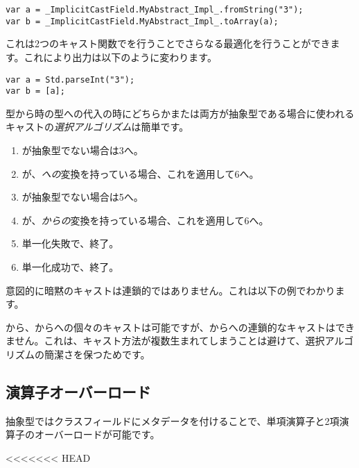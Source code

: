 \begin{lstlisting}
var a = _ImplicitCastField.MyAbstract_Impl_.fromString("3");
var b = _ImplicitCastField.MyAbstract_Impl_.toArray(a);
\end{lstlisting}

これは2つのキャスト関数でを行うことでさらなる最適化を行うことができます。これにより出力は以下のように変わります。

\begin{lstlisting}
var a = Std.parseInt("3");
var b = [a];
\end{lstlisting}


型から時の型への代入の時にどちらかまたは両方が抽象型である場合に使われるキャストの\emph{選択アルゴリズム}は簡単です。

\begin{enumerate}
	\item {}が抽象型でない場合は3へ。
	\item {}が、\emph{への}変換を持っている場合、これを適用して6へ。
	\item {}が抽象型でない場合は5へ。
	\item {}が、\emph{からの}変換を持っている場合、これを適用して6へ。
	\item 単一化失敗で、終了。
	\item 単一化成功で、終了。
\end{enumerate}



意図的に暗黙のキャストは連鎖的ではありません。これは以下の例でわかります。


から、からへの個々のキャストは可能ですが、からへの連鎖的なキャストはできません。これは、キャスト方法が複数生まれてしまうことは避けて、選択アルゴリズムの簡潔さを保つためです。




\subsection{演算子オーバーロード}
\label{types-abstract-operator-overloading}

抽象型ではクラスフィールドにメタデータを付けることで、単項演算子と2項演算子のオーバーロードが可能です。

<<<<<<< HEAD

